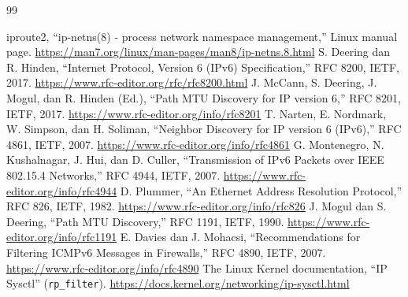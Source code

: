 \documentclass[12pt,a4paper]{report}
\newcommand{\kode}[1]{\texttt{\small #1}}
\begin{document}
\renewcommand{\bibname}{DAFTAR PUSTAKA}
\begin{thebibliography}{99}
 iproute2, ``ip-netns(8) - process network namespace management,'' Linux manual page. \url{https://man7.org/linux/man-pages/man8/ip-netns.8.html}
 S. Deering dan R. Hinden, ``Internet Protocol, Version 6 (IPv6) Specification,'' RFC 8200, IETF, 2017. \url{https://www.rfc-editor.org/rfc/rfc8200.html}
 J. McCann, S. Deering, J. Mogul, dan R. Hinden (Ed.), ``Path MTU Discovery for IP version 6,'' RFC 8201, IETF, 2017. \url{https://www.rfc-editor.org/info/rfc8201}
 T. Narten, E. Nordmark, W. Simpson, dan H. Soliman, ``Neighbor Discovery for IP version 6 (IPv6),'' RFC 4861, IETF, 2007. \url{https://www.rfc-editor.org/info/rfc4861}
 G. Montenegro, N. Kushalnagar, J. Hui, dan D. Culler, ``Transmission of IPv6 Packets over IEEE 802.15.4 Networks,'' RFC 4944, IETF, 2007. \url{https://www.rfc-editor.org/info/rfc4944}
 D. Plummer, ``An Ethernet Address Resolution Protocol,'' RFC 826, IETF, 1982. \url{https://www.rfc-editor.org/info/rfc826}
 J. Mogul dan S. Deering, ``Path MTU Discovery,'' RFC 1191, IETF, 1990. \url{https://www.rfc-editor.org/info/rfc1191}
 E. Davies dan J. Mohacsi, ``Recommendations for Filtering ICMPv6 Messages in Firewalls,'' RFC 4890, IETF, 2007. \url{https://www.rfc-editor.org/info/rfc4890}
 The Linux Kernel documentation, ``IP Sysctl'' (\kode{rp\_filter}). \url{https://docs.kernel.org/networking/ip-sysctl.html}
\end{thebibliography}

\end{document}
